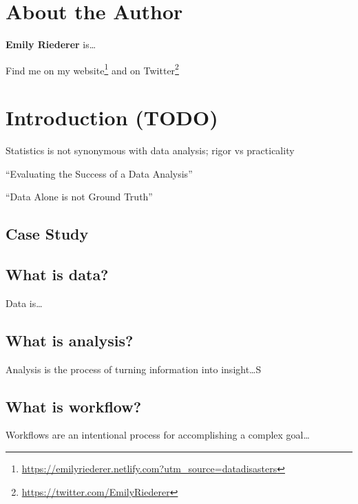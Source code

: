\documentclass[
]{krantz}
\renewcommand{\href}[2]{#2\footnote{\url{#1}}}
\begin{document}
\hypertarget{about-the-author}{%
\chapter*{About the Author}\label{about-the-author}}


\textbf{Emily Riederer} is\ldots{}

Find me on my \href{https://emilyriederer.netlify.com?utm_source=datadisasters}{website} and on \href{https://twitter.com/EmilyRiederer}{Twitter}

\mainmatter

\hypertarget{introduction-todo}{%
\chapter{Introduction (TODO)}\label{introduction-todo}}

Statistics is not synonymous with data analysis; rigor vs practicality

``Evaluating the Success of a Data Analysis'' \citep{hicks2019evaluating}

``Data Alone is not Ground Truth'' \citep{bassa_2017}

\hypertarget{case-study}{%
\section{Case Study}\label{case-study}}

\hypertarget{what-is-data}{%
\section{What is data?}\label{what-is-data}}

Data is\ldots{}

\hypertarget{what-is-analysis}{%
\section{What is analysis?}\label{what-is-analysis}}

Analysis is the process of turning information into insight\ldots S

\hypertarget{what-is-workflow}{%
\section{What is workflow?}\label{what-is-workflow}}

Workflows are an intentional process for accomplishing a complex goal\ldots{}
\end{document}
